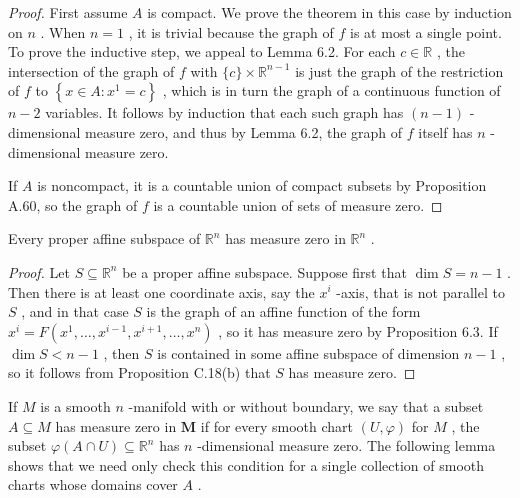 \begin{proof}
\leanok
First assume $A$ is compact. We prove the theorem in this case by induction on $n$ . When $n = 1$ , it is trivial because the graph of $f$ is at most a single point. To prove the inductive step, we appeal to Lemma 6.2. For each $c \in  \mathbb{R}$ , the intersection of the graph of $f$ with $\{ c\}  \times  {\mathbb{R}}^{n - 1}$ is just the graph of the restriction of $f$ to $\left\{  {x \in  A : {x}^{1} = c}\right\}$ , which is in turn the graph of a continuous function of $n - 2$ variables. It follows by induction that each such graph has $\left( {n - 1}\right)$ -dimensional measure zero, and thus by Lemma 6.2, the graph of $f$ itself has $n$ -dimensional measure zero.

If $A$ is noncompact, it is a countable union of compact subsets by Proposition A.60, so the graph of $f$ is a countable union of sets of measure zero.
\end{proof}

\begin{corollary}
\label{cor:6-4}
\leanok
{}
Every proper affine subspace of ${\mathbb{R}}^{n}$ has measure zero in ${\mathbb{R}}^{n}$ .
\end{corollary}

\begin{proof}
\leanok
Let $S \subseteq  {\mathbb{R}}^{n}$ be a proper affine subspace. Suppose first that $\dim S = n - 1$ . Then there is at least one coordinate axis, say the ${x}^{i}$ -axis, that is not parallel to $S$ , and in that case $S$ is the graph of an affine function of the form ${x}^{i} = F\left( {{x}^{1},\ldots ,{x}^{i - 1},{x}^{i + 1},\ldots ,{x}^{n}}\right)$ , so it has measure zero by Proposition 6.3. If $\dim S < n - 1$ , then $S$ is contained in some affine subspace of dimension $n - 1$ , so it follows from Proposition C.18(b) that $S$ has measure zero.
\end{proof}

\begin{definition}
\label{def:6-38-extra-2}
\leanok
If $M$ is a smooth $n$ -manifold with or without boundary, we say that a subset $A \subseteq  M$ has measure zero in $\mathbf{M}$ if for every smooth chart $\left( {U,\varphi }\right)$ for $M$ , the subset $\varphi \left( {A \cap  U}\right)  \subseteq  {\mathbb{R}}^{n}$ has $n$ -dimensional measure zero. The following lemma shows that we need only check this condition for a single collection of smooth charts whose domains cover $A$ .
\end{definition}

